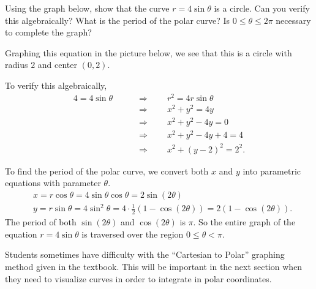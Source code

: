 \documentclass[]{ximera}
\begin{document}
\begin{problem}
Using the graph below, show that the curve $r = 4 \sin \theta$ is a circle.  
Can you verify this algebraically?  
What is the period of the polar curve?  
Is $0 \leq \theta \leq 2 \pi$ necessary to complete the graph?
	

	\begin{freeResponse}
	Graphing this equation in the picture below, we see that this is a circle with radius $2$ and center $(0,2)$.  
	
	
	To verify this algebraically,
		\begin{align*}
		4 = 4 \sin \theta \qquad
		&\Longrightarrow 	\qquad	r^2 = 4r \sin \theta  \\
		&\Longrightarrow 	\qquad	x^2 + y^2 = 4y  \\
		&\Longrightarrow 	\qquad	x^2 + y^2 - 4y = 0  \\
		&\Longrightarrow 	\qquad	x^2 + y^2 - 4y + 4 = 4  \\
		&\Longrightarrow 	\qquad	x^2 + (y-2)^2 = 2^2.
		\end{align*}
		
	To find the period of the polar curve, we convert both $x$ and $y$ into parametric equations with parameter $\theta$.  
		\begin{align*}
		&x = r \cos \theta = 4 \sin \theta \cos \theta = 2 \sin (2 \theta)  \\
		&y = r \sin \theta = 4 \sin^2 \theta = 4 \cdot \frac{1}{2} (1 - \cos(2 \theta)) = 2(1 - \cos(2 \theta)).
		\end{align*}
	The period of both $\sin(2 \theta)$ and $\cos(2 \theta)$ is $\pi$.  
	So the entire graph of the equation $r = 4 \sin \theta$ is traversed over the region $0 \leq \theta < \pi$.
	\end{freeResponse}

\end{problem}

\begin{instructorNotes}
Students sometimes have difficulty with the ``Cartesian to Polar'' graphing method given in the textbook.  
This will be important in the next section when they need to visualize curves in order to integrate in polar coordinates.
\end{instructorNotes}
\end{document}

